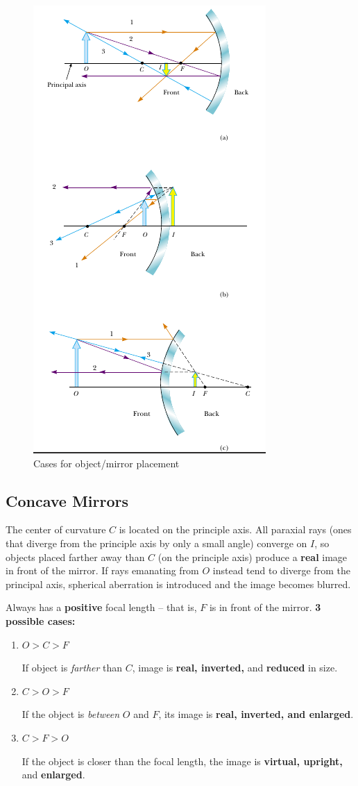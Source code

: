 \documentclass[a4paper,10pt]{report}
\begin{document}
\begin{figure}[h!]
  \begin{centering}
  \begin{center}
  \includegraphics[width=0.5\linewidth]{./3mirrors.png}
  \caption{Cases for object/mirror placement}
  \label{fig:3_mirrors}
  \end{center}
  \par\end{centering}
  \end{figure}

\subsection{Concave Mirrors}
The center of curvature $C$ is located on the principle axis. All paraxial rays (ones that diverge from the principle axis by only a small angle) converge on $I$, so objects placed farther away than $C$ (on the principle axis) produce a \textbf{real} image in front of the mirror. If rays emanating from $O$ instead tend to diverge from the principal axis, spherical aberration is introduced and the image becomes blurred.

Always has a \textbf{positive} focal length -- that is, $F$ is in front of the mirror.
\textbf{3 possible cases:}

\begin{enumerate}
 \item $O > C > F$

 If object is \textit{farther} than $C$, image is \textbf{real, inverted,} and \textbf{reduced} in size.

 \item $C > O > F$

 If the object is \textit{between} $O$ and $F$, its image is \textbf{real, inverted, and enlarged}.

 \item $C > F > O$

 If the object is closer than the focal length, the image is \textbf{virtual, upright,} and \textbf{enlarged}.
\end{enumerate}
\end{document}
